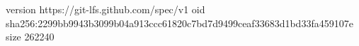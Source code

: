 version https://git-lfs.github.com/spec/v1
oid sha256:2299bb9943b3099b04a913ccc61820c7bd7d9499ceaf33683d1bd33fa459107e
size 262240

